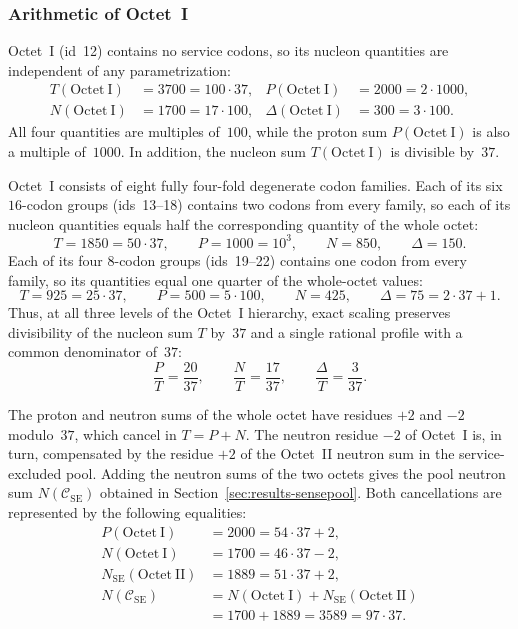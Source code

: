 \documentclass[11pt,a4paper]{article}
\renewcommand{\_}{\origunderscore\allowbreak}
\begin{document}
\subsubsection{Arithmetic of Octet~I}
\label{sec:results-octetI}

Octet~I (id~12) contains no service codons, so its nucleon quantities
are independent of any parametrization:
\[
\begin{aligned}
T(\mathrm{Octet~I}) &= 3700 = 100 \cdot 37, &
P(\mathrm{Octet~I}) &= 2000 = 2 \cdot 1000, \\
N(\mathrm{Octet~I}) &= 1700 = 17 \cdot 100, &
\Delta(\mathrm{Octet~I}) &= 300 = 3 \cdot 100.
\end{aligned}
\]
All four quantities are multiples of~$100$, while the proton sum
$P(\mathrm{Octet~I})$ is also a multiple of~$1000$. In addition, the
nucleon sum $T(\mathrm{Octet~I})$ is divisible by~$37$.

Octet~I consists of eight fully four-fold degenerate codon families.
Each of its six $16$-codon groups (ids~13--18) contains two codons from
every family, so each of its nucleon quantities equals half the
corresponding quantity of the whole octet:
\[
T = 1850 = 50 \cdot 37, \qquad
P = 1000 = 10^{3}, \qquad
N = 850, \qquad
\Delta = 150.
\]
Each of its four $8$-codon groups (ids~19--22) contains one codon from
every family, so its quantities equal one quarter of the whole-octet
values:
\[
T = 925 = 25 \cdot 37, \qquad
P = 500 = 5 \cdot 100, \qquad
N = 425, \qquad
\Delta = 75 = 2 \cdot 37 + 1.
\]
Thus, at all three levels of the Octet~I hierarchy, exact scaling
preserves divisibility of the nucleon sum $T$ by~$37$ and a single
rational profile with a common denominator of~$37$:
\[
\frac{P}{T} = \frac{20}{37},
\qquad
\frac{N}{T} = \frac{17}{37},
\qquad
\frac{\Delta}{T} = \frac{3}{37}.
\]

The proton and neutron sums of the whole octet have residues $+2$ and
$-2$ modulo~$37$, which cancel in $T = P + N$. The neutron residue
$-2$ of Octet~I is, in turn, compensated by the residue $+2$ of the
Octet~II neutron sum in the service-excluded pool. Adding the neutron
sums of the two octets gives the pool neutron sum
$N(\mathcal{C}_{\mathrm{SE}})$ obtained in
Section~\ref{sec:results-sensepool}. Both cancellations are represented
by the following equalities:
\[
\begin{aligned}
P(\mathrm{Octet~I})
  &= 2000 = 54 \cdot 37 + 2, \\
N(\mathrm{Octet~I})
  &= 1700 = 46 \cdot 37 - 2, \\
N_{\mathrm{SE}}(\mathrm{Octet~II})
  &= 1889 = 51 \cdot 37 + 2, \\
N(\mathcal{C}_{\mathrm{SE}})
  &= N(\mathrm{Octet~I})
   + N_{\mathrm{SE}}(\mathrm{Octet~II}) \\
  &= 1700 + 1889 = 3589 = 97 \cdot 37.
\end{aligned}
\]
\end{document}
